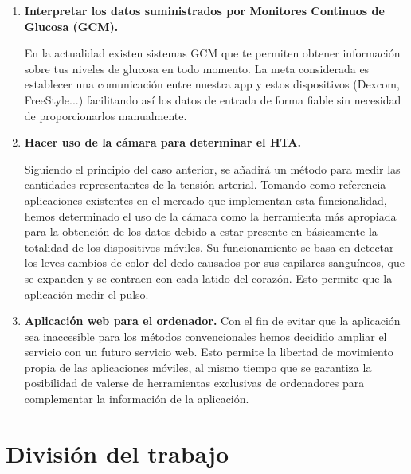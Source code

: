 \documentclass[11pt,spanish,
		listoftables,listoffigures]
		{tfgplantilla}
\begin{document}
\begin{enumerate}
	\item \textbf {Interpretar los datos suministrados por Monitores Continuos de Glucosa (GCM).}

En la actualidad existen sistemas GCM que te permiten obtener información sobre tus niveles de glucosa en todo momento. La meta considerada es establecer una comunicación entre nuestra app y estos dispositivos (Dexcom, FreeStyle...) facilitando así los datos de entrada de forma fiable sin necesidad de proporcionarlos manualmente.

	\item \textbf {Hacer uso de la cámara para determinar el HTA.} 

Siguiendo el principio del caso anterior, se añadirá un método para medir las cantidades representantes de la tensión arterial. Tomando como referencia aplicaciones existentes en el mercado que implementan esta funcionalidad, hemos determinado el uso de la cámara como la herramienta más apropiada para la obtención de los datos debido a estar presente en básicamente la totalidad de los dispositivos móviles. Su funcionamiento se basa en detectar los leves cambios de color del dedo causados por sus capilares sanguíneos, que se expanden y se contraen con cada latido del corazón. Esto permite que la aplicación medir el pulso.

	\item \textbf {Aplicación web para el ordenador.}
Con el fin de evitar que la aplicación sea inaccesible para los métodos convencionales hemos decidido ampliar el servicio con un futuro servicio web. Esto permite la libertad de movimiento propia de las aplicaciones móviles, al mismo tiempo que se garantiza la posibilidad de valerse de herramientas exclusivas de ordenadores para complementar la información de la aplicación.
\end{enumerate}


\chapter{División del trabajo}

\end{document}
